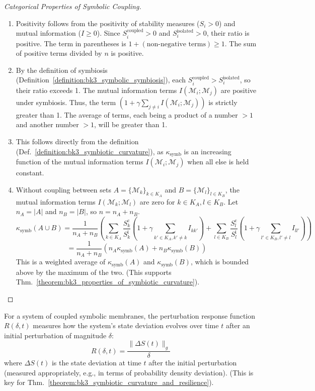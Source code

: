 \begin{proof}[Categorical Properties of Symbolic Coupling]
\label{proof:bk3_symbolic_coupling_properties_enumerated}
\leavevmode

\begin{enumerate}
    \item Positivity follows from the positivity of stability measures ($S_i > 0$) and mutual information ($I \geq 0$). Since $S_i^{\text{coupled}} > 0$ and $S_i^{\text{isolated}} > 0$, their ratio is positive. The term in parentheses is $1 + (\text{non-negative terms}) \geq 1$. The sum of positive terms divided by $n$ is positive.
    \item By the definition of symbiosis (Definition~\ref{definition:bk3_symbolic_symbiosis}), each $S_i^{\text{coupled}} > S_i^{\text{isolated}}$, so their ratio exceeds 1. The mutual information terms $I(\mathcal{M}_i; \mathcal{M}_j)$ are positive under symbiosis. Thus, the term $\left(1 + \gamma \sum_{j \neq i} I(\mathcal{M}_i; \mathcal{M}_j)\right)$ is strictly greater than 1. The average of terms, each being a product of a number $>1$ and another number $>1$, will be greater than 1.
    \item This follows directly from the definition (Def.~\ref{definition:bk3_symbiotic_curvature}), as $\kappa_{\text{symb}}$ is an increasing function of the mutual information terms $I(\mathcal{M}_i; \mathcal{M}_j)$ when all else is held constant.
    \item Without coupling between sets $A = \{\mathcal{M}_k\}_{k \in K_A}$ and $B = \{\mathcal{M}_l\}_{l \in K_B}$, the mutual information terms $I(\mathcal{M}_k; \mathcal{M}_l)$ are zero for $k \in K_A, l \in K_B$. Let $n_A = |A|$ and $n_B = |B|$, so $n = n_A + n_B$.
    \[
    \kappa_{\text{symb}}(A \cup B) = \frac{1}{n_A+n_B} \left( \sum_{k \in K_A} \frac{S_k^{\text{c}}}{S_k^{\text{i}}} (1 + \gamma \sum_{k' \in K_A, k' \neq k} I_{kk'}) + \sum_{l \in K_B} \frac{S_l^{\text{c}}}{S_l^{\text{i}}} (1 + \gamma \sum_{l' \in K_B, l' \neq l} I_{ll'}) \right)
    \]
    \[
    = \frac{1}{n_A+n_B} (n_A \kappa_{\text{symb}}(A) + n_B \kappa_{\text{symb}}(B))
    \]
    This is a weighted average of $\kappa_{\text{symb}}(A)$ and $\kappa_{\text{symb}}(B)$, which is bounded above by the maximum of the two. (This supports Thm.~\ref{theorem:bk3_properties_of_symbiotic_curvature}).
\end{enumerate}
\end{proof}

\begin{definition} \label{definition:bk3_perturbation_response_function}
For a system of coupled symbolic membranes, the perturbation response function $R(\delta, t)$ measures how the system's state deviation evolves over time $t$ after an initial perturbation of magnitude $\delta$:
\[
R(\delta, t) = \frac{\|\Delta S(t)\|_g}{\delta}
\]
where $\Delta S(t)$ is the state deviation at time $t$ after the initial perturbation (measured appropriately, e.g., in terms of probability density deviation). (This is key for Thm.~\ref{theorem:bk3_symbiotic_curvature_and_resilience}).
\end{definition}

